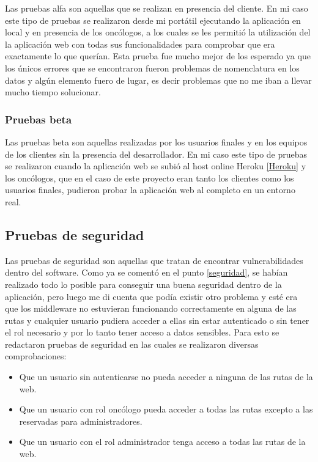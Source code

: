 Las pruebas alfa son aquellas que se realizan en presencia del cliente. En mi caso este tipo de pruebas se realizaron desde mi portátil ejecutando la aplicación en local y en presencia de los oncólogos, a los cuales se les permitió la utilización del la aplicación web con todas sus funcionalidades para comprobar que era exactamente lo que querían. Esta prueba fue mucho mejor de los esperado ya que los únicos errores que se encontraron fueron problemas de nomenclatura en los datos y algún elemento fuero de lugar, es decir problemas que no me iban a llevar mucho tiempo solucionar.

\subsubsection{Pruebas beta}

Las pruebas beta son aquellas realizadas por los usuarios finales y en los equipos de los clientes sin la presencia del desarrollador. En mi caso este tipo de pruebas se realizaron cuando la aplicación web se subió al host online Heroku \ref{Heroku} y los oncólogos, que en el caso de este proyecto eran tanto los clientes como los usuarios finales, pudieron probar la aplicación web al completo en un entorno real.

\subsection{Pruebas de seguridad}

Las pruebas de seguridad son aquellas que tratan de encontrar vulnerabilidades dentro del software. Como ya se comentó en el punto \ref{seguridad}, se habían realizado todo lo posible para conseguir una buena seguridad dentro de la aplicación, pero luego me di cuenta que podía existir otro problema y esté era que los middleware no estuvieran funcionando correctamente en alguna de las rutas y cualquier usuario pudiera acceder a ellas sin estar autenticado o sin tener el rol necesario y por lo tanto tener acceso a datos sensibles. Para esto se redactaron pruebas de seguridad en las cuales se realizaron diversas comprobaciones:
\begin{itemize}
    \item Que un usuario sin autenticarse no pueda acceder a ninguna de las rutas de la web.
    \item Que un usuario con rol oncólogo pueda acceder a todas las rutas excepto a las reservadas para administradores.
    \item Que un usuario con el rol administrador tenga acceso a todas las rutas de la web.
\end{itemize}

